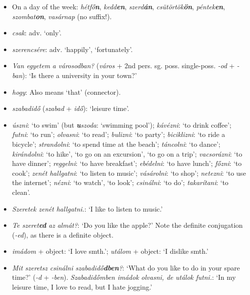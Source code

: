 \documentclass[a4paper,11pt]{article}
\begin{document}
\begin{itemize}
  \item On a day of the week: \emph{hétfő\textbf{n}},
    \emph{kedd\textbf{en}}, \emph{szerd\textbf{án}},
    \emph{csütörtök\textbf{ön}}, \emph{péntek\textbf{en}},
    \emph{szombat\textbf{on}}, \emph{vasárnap} (no suffix!).

  \item \emph{csak}: adv. `only'.

  \item \emph{szerencsére}: adv. `happily', `fortunately'.

  \item \emph{Van egyetem a városodban?} (\emph{város} + 2nd
    pers. sg. poss. single\hyp{}poss. \emph{-od} + \emph{-ban}): `Is
    there a university in your town?'

  \item \emph{hogy}: Also means `that' (connector).

  \item \emph{szabadidő} (\emph{szabad} + \emph{idő}): `leisure time'.

  \item \emph{úszni}: `to swim' (but \emph{\textbf{u}szoda}: `swimming
    pool'); \emph{kávézni}: `to drink coffee'; \emph{futni}: `to run';
    \emph{olvasni}: `to read'; \emph{bulizni}: `to party';
    \emph{biciklizni}: `to ride a bicycle'; \emph{strandolni}: `to
    spend time at the beach'; \emph{táncolni}: `to dance';
    \emph{kirándolni}: `to hike', `to go on an excursion', `to go on a
    trip'; \emph{vacsorázni}: `to have dinner'; \emph{reggelni}: `to
    have breakfast'; \emph{ebédelni}: `to have lunch'; \emph{főzni}:
    `to cook'; \emph{zenét hallgatni}: `to listen to music';
    \emph{vásárolni}: `to shop'; \emph{netezni}: `to use the
    internet'; \emph{nézni}: `to watch', `to look'; \emph{csinálni}:
    `to do'; \emph{takarítani}: `to clean'.

  \item \emph{Szeretek zenét hallgatni.}: `I like to listen to music.'

  \item \emph{Te szeret\textbf{ed} az almát?}: `Do you like the
    apple?' Note the definite conjugation (\emph{-ed}), as there is a
    definite object.

  \item \emph{imádom} + object: `I love smth.'; \emph{utálom} +
    object: `I dislike smth.'

  \item \emph{Mit szeretsz csinálni szabadidő\textbf{dben}?}: `What do
    you like to do in your spare time?' (\emph{-d} +
    \emph{-ben}). \emph{Szabadidőmben imádok olvasni, de utálok
    futni.}: `In my leisure time, I love to read, but I hate jogging.'


\end{itemize}
\end{document}
